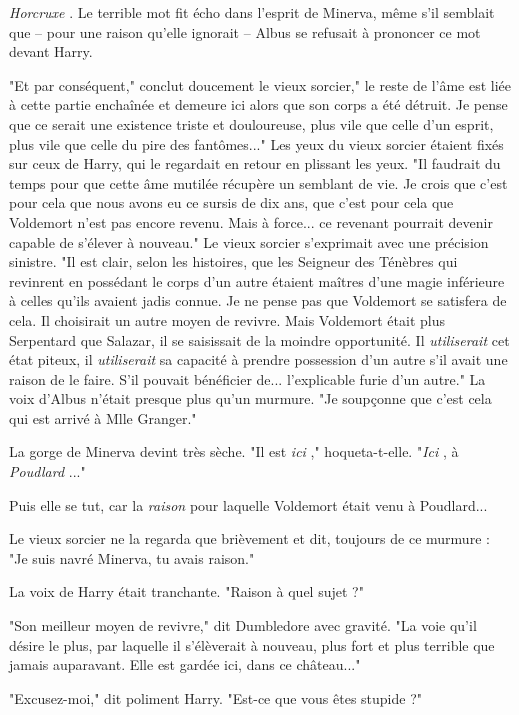 \emph{Horcruxe} . Le terrible mot fit écho dans l'esprit de Minerva, même s'il semblait que – pour une raison qu'elle ignorait – Albus se refusait à prononcer ce mot devant Harry.

"Et par conséquent," conclut doucement le vieux sorcier," le reste de l'âme est liée à cette partie enchaînée et demeure ici alors que son corps a été détruit. Je pense que ce serait une existence triste et douloureuse, plus vile que celle d'un esprit, plus vile que celle du pire des fantômes..." Les yeux du vieux sorcier étaient fixés sur ceux de Harry, qui le regardait en retour en plissant les yeux. "Il faudrait du temps pour que cette âme mutilée récupère un semblant de vie. Je crois que c'est pour cela que nous avons eu ce sursis de dix ans, que c'est pour cela que Voldemort n'est pas encore revenu. Mais à force... ce revenant pourrait devenir capable de s'élever à nouveau." Le vieux sorcier s'exprimait avec une précision sinistre. "Il est clair, selon les histoires, que les Seigneur des Ténèbres qui revinrent en possédant le corps d'un autre étaient maîtres d'une magie inférieure à celles qu'ils avaient jadis connue. Je ne pense pas que Voldemort se satisfera de cela. Il choisirait un autre moyen de revivre. Mais Voldemort était plus Serpentard que Salazar, il se saisissait de la moindre opportunité. Il \emph{utiliserait}  cet état piteux, il \emph{utiliserait}  sa capacité à prendre possession d'un autre s'il avait une raison de le faire. S'il pouvait bénéficier de... l'explicable furie d'un autre." La voix d'Albus n'était presque plus qu'un murmure. "Je soupçonne que c'est cela qui est arrivé à Mlle Granger."

La gorge de Minerva devint très sèche. "Il est \emph{ici} ," hoqueta-t-elle. "\emph{Ici} , à\emph{ Poudlard} ..."

Puis elle se tut, car la \emph{raison}  pour laquelle Voldemort était venu à Poudlard...

Le vieux sorcier ne la regarda que brièvement et dit, toujours de ce murmure : "Je suis navré Minerva, tu avais raison."

La voix de Harry était tranchante. "Raison à quel sujet ?"

"Son meilleur moyen de revivre," dit Dumbledore avec gravité. "La voie qu'il désire le plus, par laquelle il s'élèverait à nouveau, plus fort et plus terrible que jamais auparavant. Elle est gardée ici, dans ce château..."

"Excusez-moi," dit poliment Harry. "Est-ce que vous êtes stupide ?"

